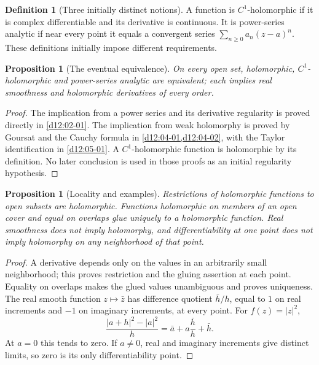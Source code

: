 \documentclass[11pt,a4paper,openany]{book}
\newtheorem{proposition}[theorem]{Proposition}
\theoremstyle{definition}
\newtheorem{definition}[theorem]{Definition}
\theoremstyle{remark}\newtheorem{remark}[theorem]{Remark}
\newcommand{\family}[1]{}
\begin{document}
\begin{definition}[Three initially distinct notions]\family{D12.01.04}\label{d12:01-04}
A function is \(C^1\)-holomorphic if it is complex differentiable and its
derivative is continuous. It is power-series analytic if near every point
it equals a convergent series \(\sum_{n\ge0}a_n(z-a)^n\).
These definitions initially impose different requirements.
\end{definition}
\begin{proposition}[The eventual equivalence]\label{d12:01-04-equivalence}
On every open set, holomorphic, \(C^1\)-holomorphic and power-series analytic
are equivalent; each implies real smoothness and holomorphic derivatives
of every order.
\end{proposition}
\begin{proof}
The implication from a power series and its derivative regularity is
proved directly in \cref{d12:02-01}. The implication from weak holomorphy
is proved by Goursat and the Cauchy formula in
\cref{d12:04-01,d12:04-02}, with the Taylor identification in
\cref{d12:05-01}. A \(C^1\)-holomorphic function is holomorphic by its
definition. No later conclusion is used in those proofs as an initial
regularity hypothesis.
\end{proof}

\begin{proposition}[Locality and examples]\family{D12.01.05}\label{d12:01-05}
Restrictions of holomorphic functions to open subsets are holomorphic.
Functions holomorphic on members of an open cover and equal on overlaps
glue uniquely to a holomorphic function. Real smoothness does not imply
holomorphy, and differentiability at one point does not imply holomorphy
on any neighborhood of that point.
\end{proposition}
\begin{proof}
A derivative depends only on the values in an arbitrarily small neighborhood;
this proves restriction and the gluing assertion at each point. Equality
on overlaps makes the glued values unambiguous and proves uniqueness.
The real smooth function \(z\mapsto\bar z\) has difference quotient
\(\bar h/h\), equal to \(1\) on real increments and \(-1\) on imaginary
increments, at every point. For \(f(z)=|z|^2\),
\[
 \frac{|a+h|^2-|a|^2}{h}
 =\bar a+a\frac{\bar h}{h}+\bar h.
\]
At \(a=0\) this tends to zero. If \(a\ne0\), real and imaginary increments
give distinct limits, so zero is its only differentiability point.
\end{proof}
\end{document}
